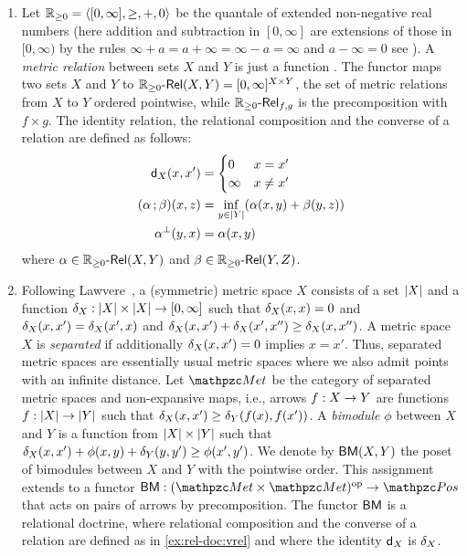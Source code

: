\begin{example}
\begin{enumerate}
% 
\item\label{ex:rel-doc:vrel}
Let $\mathbb{R}_{\ge 0} = {\langle [0,\infty],\ge,+,0 \rangle }$ be the quantale of extended non-negative real numbers  (here addition and subtraction in $[0,\infty]$ are extensions of those in $[0,\infty)$ by the rules $\infty+a=a+\infty=\infty-a=\infty$ and $a-\infty=0$ see \cite{Lawvere73}).
A \emph{metric relation} between sets $X$ and $Y$ is just a function . 
The functor \fun{\VRel\RPos}{\bop\Set}{\Pos} maps two sets $X$ and $Y$ to 
${\mathbb{R}_{\ge 0}}\text{-}\mathsf{Rel}(X,Y) = [0,\infty]^{X\times Y}$, the set of metric relations from $X$ to $Y$  ordered pointwise, while ${\mathbb{R}_{\ge 0}}\text{-}\mathsf{Rel}_{f,g}$ is the precomposition with $f\times g$. 
The identity relation, the relational composition and the converse of a relation are defined as follows: 
\begin{align*}
\mathsf{d}_X(x,x') &= \begin{cases}
0 & x = x' \\
\infty & x \ne x' 
\end{cases}
\\ 
(\alpha\mathop{\mathbf{;}}\beta)(x,z) &= \inf_{y\in|Y|} (\alpha(x,y) + \beta(y,z)) 
\\ 
\alpha^{\bot}(y,x) &= \alpha(x,y)
\end{align*}
%
where $\alpha\in{\mathbb{R}_{\ge 0}}\text{-}\mathsf{Rel}(X,Y)$ and $\beta\in{\mathbb{R}_{\ge 0}}\text{-}\mathsf{Rel}(Y,Z)$. 

\item\label{ex:rel-doc:met} 
 Following Lawvere~\cite{Lawvere73}, a (symmetric) metric space $X$ consists of a set $|X|$ and a function 
$\fun{\dist_X}{\Car{X}\times\Car{X}}{[0,\infty]}$ such that $\delta_X(x,x)=0$ and $\delta_{X}(x,x')=\delta_{X}(x',x)$ and $\delta_{X}(x,x')+\delta_{X}(x',x'')\ge\delta_{X}(x,x'')$. 
A metric space $X$ is \emph{separated} if additionally $\delta_X(x,x') = 0$ implies $x = x'$. 
Thus, separated metric spaces are essentially usual metric spaces where we also admit points with an infinite distance. 
Let $\Met$ be the category of separated metric spaces and non-expansive maps, i.e., 
arrows $\fun{f}{X}{Y}$ are functions $\fun{f}{\Car{X}}{\Car{Y}}$ such that 
$\delta_X(x,x') \ge \delta_Y(f(x),f(x'))$. 
A \emph{bimodule} $\phi$ between $X$ and $Y$ 
is a function 
from $|X|\times|Y|$ such that 
$\delta_{X}(x,x')+\phi(x,y)+\delta_{Y}(y,y')\ge\phi(x',y')$. 
We denote by $\mathsf{BM}(X,Y)$ the poset of bimodules between $X$ and $Y$ with the pointwise order. 
This assignment extends to a functor  $\fun{\BM}{\bop\Met}{\Pos}$ that acts on pairs of arrows by precomposition. 
The functor $\mathsf{BM}$ is a relational doctrine, where relational composition and the converse of a relation are defined as in \cref{ex:rel-doc:vrel} and where the identity $\mathsf{d}_X$ is $\delta_X$.  
\end{enumerate}
\end{example}


